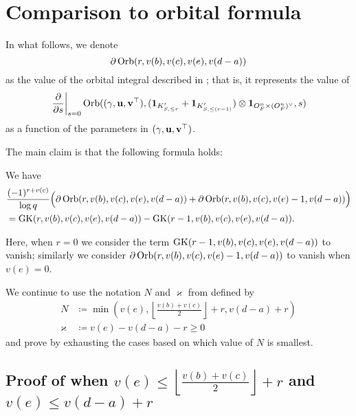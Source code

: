 \section{Comparison to orbital formula}
In what follows, we denote
\[ \partial\operatorname{Orb}(r, v(b), v(c), v(e), v(d-a)) \]
as the value of the orbital integral described in ; that is,
it represents the value of
\[ \left. \pdv{}{s} \right\rvert_{s=0}
  \operatorname{Orb}({(\gamma, \mathbf u, \mathbf v^\top)}, (\mathbf{1}_{K'_{S, \le r}} + \mathbf{1}_{K'_{S, \le (r-1)}}) \otimes \mathbf{1}_{O_F^n \times (O_F^n)^\vee}, s) \]
as a function of the parameters in ${(\gamma, \mathbf u, \mathbf v^\top)}$.

The main claim is that the following formula holds:
\begin{proposition}
  \label{prop:finale_by_one}
  We have
  \begin{align*}
    &\frac{(-1)^{r+v(c)}}{\log q}\Big(\partial\operatorname{Orb}(r, v(b), v(c), v(e), v(d-a))
      + \partial\operatorname{Orb}(r, v(b), v(c), v(e)-1, v(d-a))\Big) \\
    &= \operatorname{GK}(r, v(b), v(c), v(e), v(d-a)) - \operatorname{GK}(r-1, v(b), v(c), v(e), v(d-a)).
  \end{align*}
\end{proposition}
Here, when $r=0$ we consider the term
$\operatorname{GK}(r-1, v(b), v(c), v(e), v(d-a))$ to vanish;
similarly we consider
$\partial\operatorname{Orb}(r, v(b), v(c), v(e)-1, v(d-a))$ to vanish when $v(e)=0$.

We continue to use the notation $N$ and $\varkappa$ from  defined by
\begin{align*}
  N &\coloneqq \min \left( v(e),
    \left\lfloor \tfrac{v(b)+v(c)}{2} \right\rfloor + r, v(d-a) + r \right) \\
  \varkappa &\coloneqq v(e) - v(d-a) - r \ge 0
\end{align*}
and prove  by exhausting the
cases based on which value of $N$ is smallest.

\subsection{Proof of 
  when $v(e) \le \left\lfloor \tfrac{v(b)+v(c)}{2} \right\rfloor + r$
  and $v(e) \le v(d-a) + r$}
